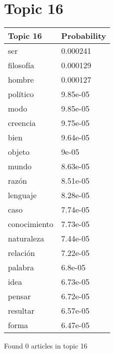 \documentclass{article}
\begin{document}
\section*{Topic 16}\vfill
\begin{tabular}{ll}
\toprule
     Topic 16 & Probability \\
\midrule
          ser &    0.000241 \\
    filosofía &    0.000129 \\
       hombre &    0.000127 \\
     político &    9.85e-05 \\
         modo &    9.85e-05 \\
     creencia &    9.75e-05 \\
         bien &    9.64e-05 \\
       objeto &       9e-05 \\
        mundo &    8.63e-05 \\
        razón &    8.51e-05 \\
     lenguaje &    8.28e-05 \\
         caso &    7.74e-05 \\
 conocimiento &    7.73e-05 \\
   naturaleza &    7.44e-05 \\
     relación &    7.22e-05 \\
      palabra &     6.8e-05 \\
         idea &    6.73e-05 \\
       pensar &    6.72e-05 \\
     resultar &    6.57e-05 \\
        forma &    6.47e-05 \\
\bottomrule
\end{tabular}

\vfill
Found 0 articles in topic 16

\vfill
\newpage
\end{document}
